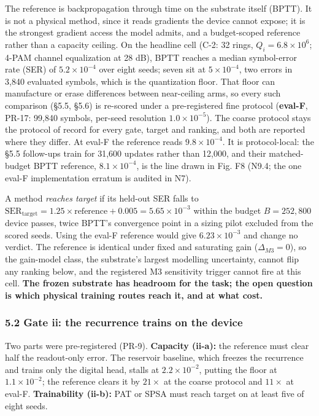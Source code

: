 \documentclass[
  10pt,
]{article}
\begin{document}
The reference is backpropagation through time on the substrate itself
(BPTT). It is not a physical method, since it reads gradients the device
cannot expose; it is the strongest gradient access the model admits, and
a budget-scoped reference rather than a capacity ceiling. On the
headline cell (C-2: 32 rings, \(Q_i = 6.8\times10^6\); 4-PAM channel
equalization at 28 dB), BPTT reaches a median symbol-error rate (SER) of
\(5.2\times10^{-4}\) over eight seeds; seven sit at \(5\times10^{-4}\),
two errors in 3,840 evaluated symbols, which is the quantization floor.
That floor can manufacture or erase differences between near-ceiling
arms, so every such comparison (§5.5, §5.6) is re-scored under a
pre-registered fine protocol (\textbf{eval-F}, PR-17: 99,840 symbols,
per-seed resolution \(1.0\times10^{-5}\)). The coarse protocol stays the
protocol of record for every gate, target and ranking, and both are
reported where they differ. At eval-F the reference reads
\(9.8\times10^{-4}\). It is protocol-local: the §5.5 follow-ups train
for 31,600 updates rather than 12,000, and their matched-budget BPTT
reference, \(8.1\times10^{-4}\), is the line drawn in Fig. F8 (N9.4; the
one eval-F implementation erratum is audited in N7).

A method \emph{reaches target} if its held-out SER falls to
\(\text{SER}_\text{target} =
1.25\times\text{reference} + 0.005 = 5.65\times10^{-3}\) within the
budget \(B = 252{,}800\) device passes, twice BPTT's convergence point
in a sizing pilot excluded from the scored seeds. Using the eval-F
reference would give \(6.23\times10^{-3}\) and change no verdict. The
reference is identical under fixed and saturating gain
(\(\Delta_{M3}=0\)), so the gain-model class, the substrate's largest
modelling uncertainty, cannot flip any ranking below, and the registered
M3 sensitivity trigger cannot fire at this cell. \textbf{The frozen
substrate has headroom for the task; the open question is which physical
training routes reach it, and at what cost.}

\subsubsection{5.2 Gate ii: the recurrence trains on the
device}\label{gate-ii-the-recurrence-trains-on-the-device}

Two parts were pre-registered (PR-9). \textbf{Capacity (ii-a):} the
reference must clear half the readout-only error. The reservoir
baseline, which freezes the recurrence and trains only the digital head,
stalls at \(2.2\times10^{-2}\), putting the floor at
\(1.1\times10^{-2}\); the reference clears it by \(21\times\) at the
coarse protocol and \(11\times\) at eval-F. \textbf{Trainability
(ii-b):} PAT or SPSA must reach target on at least five of eight seeds.
\end{document}
